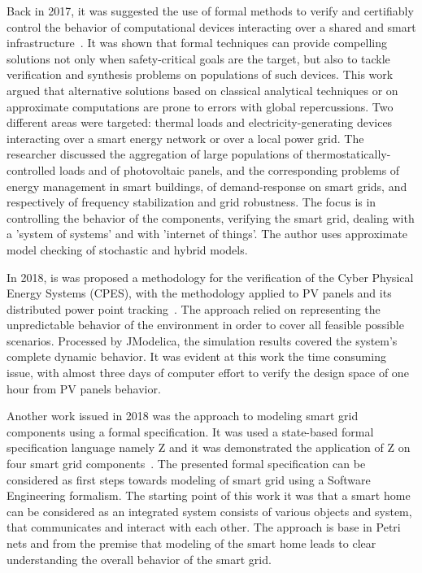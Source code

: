 \documentclass[runningheads]{llncs}
\begin{document}
Back in 2017, it was suggested the use of formal methods to verify and certifiably control the behavior of computational devices interacting over a shared and smart infrastructure~\cite{Abate2017}. It was shown that formal techniques can provide compelling solutions not only when safety-critical goals are the target, but also to tackle verification and synthesis problems on populations of such devices. This work argued that alternative solutions based on classical analytical techniques or on approximate computations are prone to errors with global repercussions. Two different areas were targeted: thermal loads and electricity-generating devices interacting over a smart energy network or over a local power grid. The researcher discussed the aggregation of large populations of thermostatically-controlled loads and of photovoltaic panels, and the corresponding problems of energy management in smart buildings, of demand-response on smart grids, and respectively of frequency stabilization and grid robustness. The focus is in controlling the behavior of the components, verifying the smart grid, dealing with a 'system of systems' and with 'internet of things'. The author uses approximate model checking of stochastic and hybrid models. %

In 2018, is was proposed a methodology for the verification of the Cyber Physical Energy Systems (CPES), with the methodology applied to PV panels and its distributed power point tracking~\cite{Driouich2018}. The approach relied on representing the unpredictable behavior of the environment in order to cover all feasible possible scenarios. Processed by JModelica, the simulation results covered the system's complete dynamic behavior. It was evident at this work the time consuming issue, with almost three days of computer effort to verify the design space of one hour from PV panels behavior. %

Another work issued in 2018 was the approach to modeling smart grid components using a formal specification. It was used a state-based formal specification language namely Z %
and it was demonstrated the application of Z on four smart grid components~\cite{Akram2018}. The presented formal specification can be considered as first steps towards modeling of smart grid using a Software Engineering formalism. The starting point of this work it was that a smart home can be considered as an integrated system consists of various objects and system, that communicates and interact  with  each  other. The approach is base in Petri nets and from the premise that modeling of the smart home leads to clear understanding the overall behavior of the smart grid.
\end{document}
